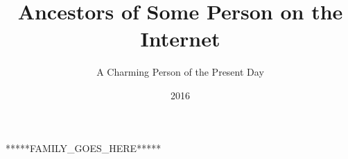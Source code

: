 \documentclass{book}
\title{Ancestors of Some Person on the Internet}
\author{A Charming Person of the Present Day}
\date{2016}
\begin{document}
\frontmatter
\maketitle
\tableofcontents

\mainmatter

*****FAMILY_GOES_HERE*****
\end{document}
